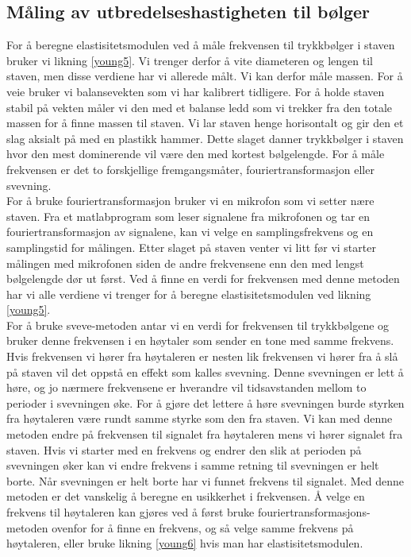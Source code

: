 \documentclass[%
 reprint,
 amsmath,amssymb,
 aps,
]{revtex4-1}
\begin{document}
\subsection{Måling av utbredelseshastigheten til bølger}
For å beregne elastisitetsmodulen ved å måle frekvensen til trykkbølger i staven bruker vi likning \eqref{young5}. Vi trenger derfor å vite diameteren og lengen til staven, men disse verdiene har vi allerede målt. Vi kan derfor måle massen. For å veie bruker vi balansevekten som vi har kalibrert tidligere. For å holde staven stabil på vekten måler vi den med et balanse ledd som vi trekker fra den totale massen for å finne massen til staven. Vi lar staven henge horisontalt og gir den et slag aksialt på med en plastikk hammer. Dette slaget danner trykkbølger i staven hvor den mest dominerende vil være den med kortest bølgelengde. For å måle frekvensen er det to forskjellige fremgangsmåter, fouriertransformasjon eller svevning.\\
For å bruke fouriertransformasjon bruker vi en mikrofon som vi setter nære staven. Fra et matlabprogram som leser signalene fra mikrofonen og tar en fouriertransformasjon av signalene, kan vi velge en samplingsfrekvens og en samplingstid for målingen. Etter slaget på staven venter vi litt før vi starter målingen med mikrofonen siden de andre frekvensene enn den med lengst bølgelengde dør ut først. Ved å finne en verdi for frekvensen med denne metoden har vi alle verdiene vi trenger for å beregne elastisitetsmodulen ved likning \eqref{young5}.\\
For å bruke sveve-metoden antar vi en verdi for frekvensen til trykkbølgene og bruker denne frekvensen i en høytaler som sender en tone med samme frekvens. Hvis frekvensen vi hører fra høytaleren er nesten lik frekvensen vi hører fra å slå på staven vil det oppstå en effekt som kalles svevning. Denne svevningen er lett å høre, og jo nærmere frekvensene er hverandre vil tidsavstanden mellom to perioder i svevningen øke. For å gjøre det lettere å høre svevningen burde styrken fra høytaleren være rundt samme styrke som den fra staven. Vi kan med denne metoden endre på frekvensen til signalet fra høytaleren mens vi hører signalet fra staven. Hvis vi starter med en frekvens og endrer den slik at perioden på svevningen øker kan vi endre frekvens i samme retning til svevningen er helt borte. Når svevningen er helt borte har vi funnet frekvens til signalet. Med denne metoden er det vanskelig å beregne en usikkerhet i frekvensen. Å velge en frekvens til høytaleren kan gjøres ved å først bruke fouriertransformasjons-metoden ovenfor for å finne en frekvens, og så velge samme frekvens på høytaleren, eller bruke likning \eqref{young6} hvis man har elastisitetsmodulen.
\end{document}
